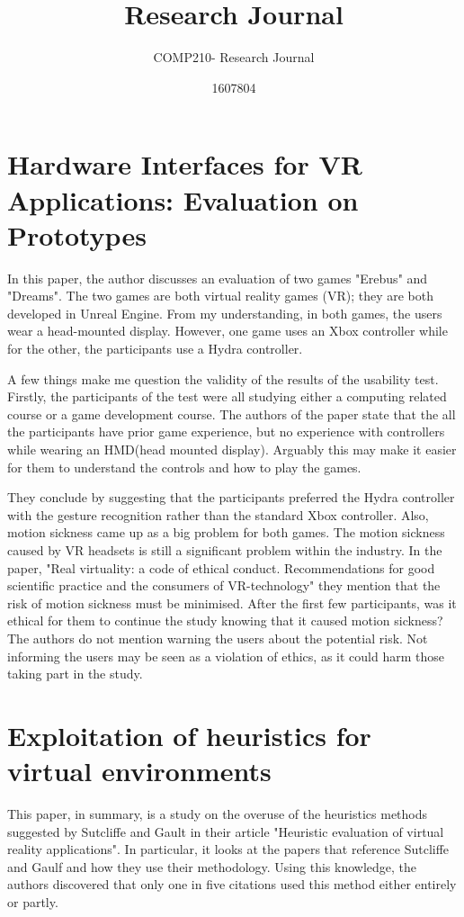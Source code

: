 \documentclass{scrartcl}
\title{Research Journal}
\subtitle{COMP210- Research Journal}
\author{1607804}
\begin{document}
\maketitle

\section{Hardware Interfaces for VR Applications: Evaluation on Prototypes\cite{mentzelopoulos2015hardware}}

In this paper, the author discusses an evaluation of two games "Erebus" and "Dreams".
The two games are both virtual reality games (VR); they are both developed in Unreal Engine.
From my understanding, in both games, the users wear a head-mounted display. However, one game uses an Xbox controller while for the other, the participants use a Hydra controller. 

A few things make me question the validity of the results of the usability test.
Firstly, the participants of the test were all studying either a computing related course or a game development course. 
The authors of the paper state that the all the participants have prior game experience, but no experience with controllers while wearing an HMD(head mounted display). 
Arguably this may make it easier for them to understand the controls and how to play the games.

They conclude by suggesting that the participants preferred the Hydra controller with the gesture recognition rather than the standard Xbox controller. 
Also, motion sickness came up as a big problem for both games. The motion sickness caused by VR headsets is still a significant problem within the industry\cite{fernandes2016combating, hettinger1992visually, von2016cyber}. In the paper, "Real virtuality: a code of ethical conduct. Recommendations for good scientific practice and the consumers of VR-technology" \cite{madary2016real} they mention that the risk of motion sickness must be minimised\cite{behr2005some}. After the first few participants, was it ethical for them to continue the study knowing that it caused motion sickness? The authors do not mention warning the users about the potential risk.  Not informing the users may be seen as a violation of ethics, as it could harm those taking part in the study. 

\section{Exploitation of heuristics for virtual environments \cite {hvannberg2012exploitation}}
This paper, in summary, is a study on the overuse of the heuristics methods suggested by Sutcliffe and Gault in their article "Heuristic evaluation of virtual reality applications"\cite{sutcliffe2004heuristic}. In particular, it looks at the papers that reference Sutcliffe and Gaulf and how they use their methodology. Using this knowledge, the authors discovered that only one in five citations used this method either entirely or partly.
\end{document}
